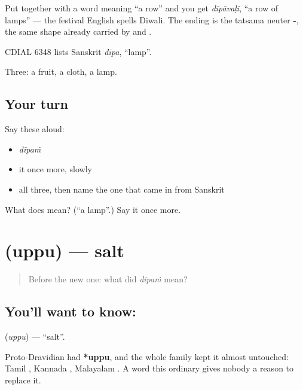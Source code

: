 Put  together with a word meaning \textquotedblleft{}a row\textquotedblright{} and you get \emph{dīpāvaḷi}, \textquotedblleft{}a row of lamps\textquotedblright{} — the festival English spells Diwali. The ending is the tatsama neuter \textbf{-}, the same shape already carried by  and .

CDIAL 6348 lists Sanskrit \emph{dīpa}, \textquotedblleft{}lamp\textquotedblright{}.

\begin{grammarlens}[title={What you've built}]
Three: a fruit, a cloth, a lamp.
\end{grammarlens}

\subsection*{Your turn}
Say these aloud:

\begin{itemize}
\raggedright
  \item \emph{dīpaṁ}
  \item it once more, slowly
  \item all three, then name the one that came in from Sanskrit
\end{itemize}

\begin{tcolorbox}[breakable,colback=teal!4,colframe=teal!35!black,title={Before you move on}]
What does  mean? (\textquotedblleft{}a lamp\textquotedblright{}.) Say it once more.
\end{tcolorbox}
\section[\texorpdfstring{\te{ఉప్పు} (uppu)}{ఉప్పు (uppu)}]{ (uppu) — salt}

\label{lesson:TE-C46-salt}



\begin{quote}
Before the new one: what did \emph{dīpaṁ} mean?
\end{quote}

\subsection*{You'll want to know: }
\textbf{} (\emph{uppu}) — \textquotedblleft{}salt\textquotedblright{}.

Proto-Dravidian had \textbf{*uppu}, and the whole family kept it almost untouched: Tamil , Kannada , Malayalam . A word this ordinary gives nobody a reason to replace it.

